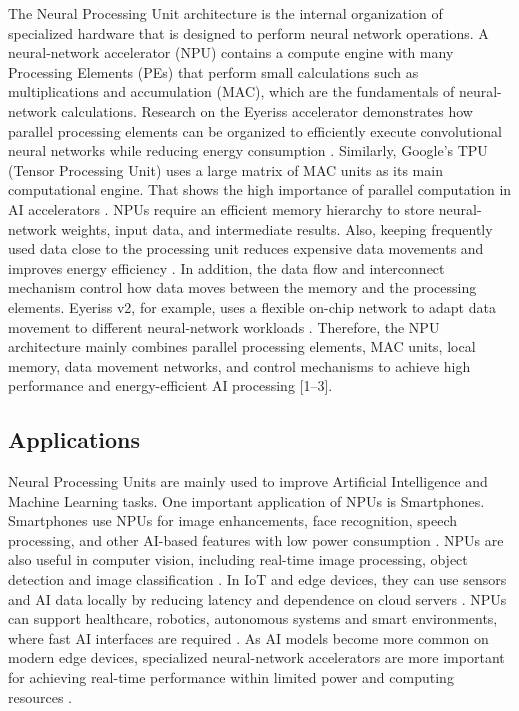 The Neural Processing Unit architecture is the internal organization of specialized hardware that is 
designed to perform neural network operations. A neural-network accelerator (NPU) contains a compute 
engine with many Processing Elements (PEs) that perform small calculations such as multiplications and 
accumulation (MAC), which are the fundamentals of neural-network calculations. Research on the Eyeriss 
accelerator demonstrates how parallel processing elements can be organized to efficiently execute 
convolutional neural networks while reducing energy consumption \cite{paper_1}. Similarly, Google’s TPU 
(Tensor Processing Unit) uses a large matrix of MAC units as its main computational engine. 
That shows the high importance of parallel computation in AI accelerators \cite{paper_2}. NPUs require an 
efficient memory hierarchy to store neural-network weights, input data, and intermediate results. 
Also, keeping frequently used data close to the processing unit reduces expensive data movements and 
improves energy efficiency \cite{paper_1}. In addition, the data flow and interconnect mechanism control how data 
moves between the memory and the processing elements. Eyeriss v2, for example, uses a flexible on-chip 
network to adapt data movement to different neural-network workloads \cite{paper_3}. 
Therefore, the NPU architecture mainly combines parallel processing elements, MAC units, local memory, 
data movement networks, and control mechanisms to achieve high performance and 
energy-efficient AI processing [1–3].

\subsection{Applications}
Neural Processing Units are mainly used to improve Artificial Intelligence and Machine Learning tasks. 
One important application of NPUs is Smartphones. Smartphones use NPUs for image enhancements, 
face recognition, speech processing, and other AI-based features with low power consumption \cite{paper_4}. 
NPUs are also useful in computer vision, including real-time image processing, object detection 
and image classification \cite{paper_1}. In IoT and edge devices, they can use sensors and AI data locally 
by reducing latency and dependence on cloud servers \cite{paper_5}. NPUs can support healthcare, robotics, 
autonomous systems and smart environments, where fast AI interfaces are required \cite{paper_5}. As AI models 
become more common on modern edge devices, specialized neural-network accelerators are more 
important for achieving real-time performance within limited power and computing resources \cite{paper_5}.

